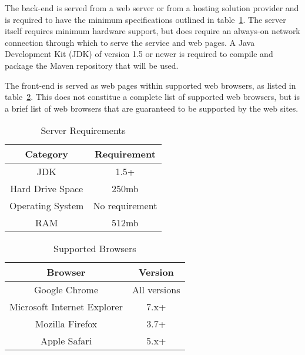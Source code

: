 \documentclass{article}
\begin{document}
The back-end is served from a web server or from a hosting solution provider and is
required to have the minimum specifications outlined in table~\ref{server}.  The
server itself requires minimum hardware support, but does require an always-on
network connection through which to serve the service and web pages.  A Java
Development Kit (JDK) of version 1.5 or newer is required to compile and package
the Maven repository that will be used.

The front-end is served as web pages within supported web browsers, as listed in
table~\ref{browsers}.  This does not constitue a complete list of supported web
browsers, but is a brief list of web browsers that are guaranteed to be supported
by the web sites.

\begin{table}
    \centering
    \begin{tabular}{|c|c|}\hline
        Category & Requirement \\\hline\hline
        JDK & 1.5+ \\\hline
        Hard Drive Space & 250mb \\\hline
        Operating System & No requirement \\\hline
        RAM & 512mb \\\hline
    \end{tabular}
    \caption{Server Requirements}
    \label{server}
\end{table}

\begin{table}
    \centering
    \begin{tabular}{|c|c|}\hline
        Browser & Version \\\hline\hline
        Google Chrome & All versions  \\\hline
        Microsoft Internet Explorer & 7.x+ \\\hline
        Mozilla Firefox & 3.7+ \\\hline
        Apple Safari & 5.x+ \\\hline
    \end{tabular}
    \caption{Supported Browsers}
    \label{browsers}
\end{table}
\end{document}
